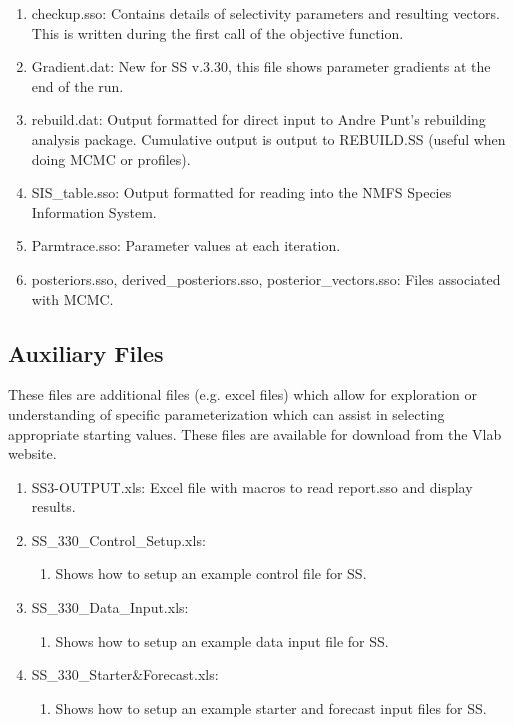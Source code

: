 \begin{enumerate}
		\item checkup.sso: Contains details of selectivity parameters and resulting vectors.  This is written during the first call of the objective function.
		\item Gradient.dat: New for SS v.3.30, this file shows parameter gradients at the end of the run.
		\item rebuild.dat: Output formatted for direct input to Andre Punt's rebuilding analysis package.  Cumulative output is output to REBUILD.SS (useful when doing MCMC or profiles).
		\item SIS\_table.sso: Output formatted for reading into the NMFS Species Information System.
		\item Parmtrace.sso: Parameter values at each iteration.
		\item posteriors.sso, derived\_posteriors.sso, posterior\_vectors.sso: Files associated with MCMC.
	\end{enumerate}

	
	\subsection{Auxiliary Files}
	These files are additional files (e.g. excel files) which allow for exploration or understanding of specific parameterization which can assist in selecting appropriate starting values.  These files are available for download from the Vlab website. 
	\begin{enumerate}
		\item SS3-OUTPUT.xls: Excel file with macros to read report.sso and display results.
		\item SS\_330\_Control\_Setup.xls:
		\begin{enumerate}
			\item Shows how to setup an example control file for SS.
		\end{enumerate}
		\item SS\_330\_Data\_Input.xls:
		\begin{enumerate}
			\item Shows how to setup an example data input file for SS.
		\end{enumerate}
		\item SS\_330\_Starter\&Forecast.xls:
		\begin{enumerate}
			\item Shows how to setup an example starter and forecast input files for SS.
		\end{enumerate}

	\end{enumerate}

